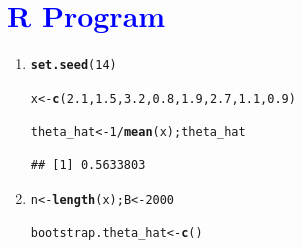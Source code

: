\documentclass[11pt, a4paper]{article}\usepackage[]{graphicx}\usepackage[]{xcolor}
\makeatletter
\newcommand{\hlnum}[1]{\textcolor[rgb]{0.686,0.059,0.569}{#1}}%
\newcommand{\hlopt}[1]{\textcolor[rgb]{0,0,0}{#1}}%
\newcommand{\hldef}[1]{\textcolor[rgb]{0.345,0.345,0.345}{#1}}%
\newcommand{\hlkwb}[1]{\textcolor[rgb]{0.69,0.353,0.396}{#1}}%
\newcommand{\hlkwd}[1]{\textcolor[rgb]{0.737,0.353,0.396}{\textbf{#1}}}%
\newenvironment{kframe}{%
 \def\at@end@of@kframe{}%
 \ifinner\ifhmode%
  \def\at@end@of@kframe{\end{minipage}}%
  \begin{minipage}{\columnwidth}%
 \fi\fi%
 \def\FrameCommand##1{\hskip\@totalleftmargin \hskip-\fboxsep
 \colorbox{shadecolor}{##1}\hskip-\fboxsep
     \hskip-\linewidth \hskip-\@totalleftmargin \hskip\columnwidth}%
 \MakeFramed {\advance\hsize-\width
   \@totalleftmargin\z@ \linewidth\hsize
   \@setminipage}}%
 {\par\unskip\endMakeFramed%
 \at@end@of@kframe}
\newenvironment{knitrout}{}{} %
\makeatother
\begin{document}
\section*{\faArrowAltCircleRight[regular] \textcolor{blue}{R Program}}

\begin{enumerate}

\item[\scalebox{2.0}{\twemoji{keycap: 1}}]



\begin{knitrout}
\color{fgcolor}\begin{kframe}
\begin{alltt}
\hlkwd{set.seed}\hldef{(}\hlnum{14}\hldef{)}
\end{alltt}
\end{kframe}
\end{knitrout}

\begin{knitrout}
\color{fgcolor}\begin{kframe}
\begin{alltt}
\hldef{x} \hlkwb{<-} \hlkwd{c}\hldef{(}\hlnum{2.1}\hldef{,} \hlnum{1.5}\hldef{,} \hlnum{3.2}\hldef{,} \hlnum{0.8}\hldef{,} \hlnum{1.9}\hldef{,} \hlnum{2.7}\hldef{,} \hlnum{1.1}\hldef{,} \hlnum{0.9}\hldef{)}

\hldef{theta_hat} \hlkwb{<-} \hlnum{1} \hlopt{/} \hlkwd{mean}\hldef{(x); theta_hat}
\end{alltt}
\begin{verbatim}
## [1] 0.5633803
\end{verbatim}
\end{kframe}
\end{knitrout}

\item[\scalebox{2.0}{\twemoji{keycap: 2}}]

\begin{knitrout}
\color{fgcolor}\begin{kframe}
\begin{alltt}
\hldef{n} \hlkwb{<-} \hlkwd{length}\hldef{(x); B} \hlkwb{<-} \hlnum{2000}
\end{alltt}
\end{kframe}
\end{knitrout}

\begin{knitrout}
\color{fgcolor}\begin{kframe}
\begin{alltt}
\hldef{bootstrap.theta_hat} \hlkwb{<-} \hlkwd{c}\hldef{()}


\end{alltt}
\end{kframe}
\end{knitrout}
\end{enumerate}
\end{document}
